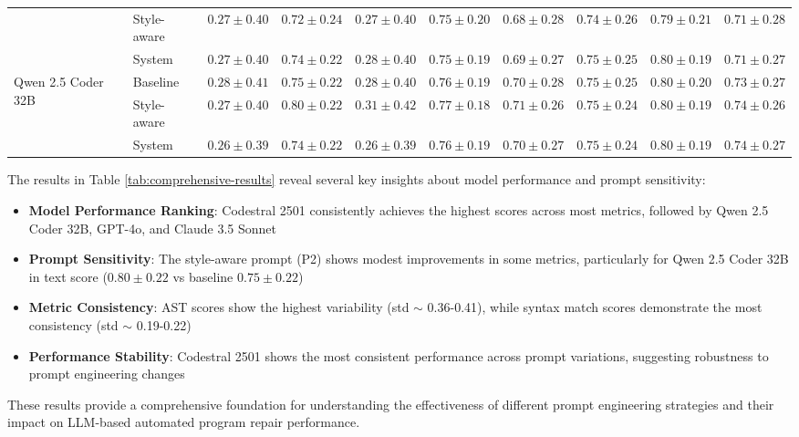\begin{table}[h!]
{\begin{tabular}{|l|l|c|c|c|c|c|c|c|c|}
\cline{2-10}
& Style-aware & $0.27 \pm 0.40$ & $0.72 \pm 0.24$ & $0.27 \pm 0.40$ & $0.75 \pm 0.20$ & $0.68 \pm 0.28$ & $0.74 \pm 0.26$ & $0.79 \pm 0.21$ & $0.71 \pm 0.28$ \\
\cline{2-10}
& System & $0.27 \pm 0.40$ & $0.74 \pm 0.22$ & $0.28 \pm 0.40$ & $0.75 \pm 0.19$ & $0.69 \pm 0.27$ & $0.75 \pm 0.25$ & $0.80 \pm 0.19$ & $0.71 \pm 0.27$ \\
\hline
\multirow{3}{*}{Qwen 2.5 Coder 32B} & Baseline & $0.28 \pm 0.41$ & $0.75 \pm 0.22$ & $0.28 \pm 0.40$ & $0.76 \pm 0.19$ & $0.70 \pm 0.28$ & $0.75 \pm 0.25$ & $0.80 \pm 0.20$ & $0.73 \pm 0.27$ \\
\cline{2-10}
& Style-aware & $0.27 \pm 0.40$ & $0.80 \pm 0.22$ & $0.31 \pm 0.42$ & $0.77 \pm 0.18$ & $0.71 \pm 0.26$ & $0.75 \pm 0.24$ & $0.80 \pm 0.19$ & $0.74 \pm 0.26$ \\
\cline{2-10}
& System & $0.26 \pm 0.39$ & $0.74 \pm 0.22$ & $0.26 \pm 0.39$ & $0.76 \pm 0.19$ & $0.70 \pm 0.27$ & $0.75 \pm 0.24$ & $0.80 \pm 0.19$ & $0.74 \pm 0.27$ \\
\hline
\end{tabular}%
}
\end{table}

The results in Table \ref{tab:comprehensive-results} reveal several key insights about model performance and prompt sensitivity:

\begin{itemize}
    \item \textbf{Model Performance Ranking}: Codestral 2501 consistently achieves the highest scores across most metrics, followed by Qwen 2.5 Coder 32B, GPT-4o, and Claude 3.5 Sonnet
    \item \textbf{Prompt Sensitivity}: The style-aware prompt (P2) shows modest improvements in some metrics, particularly for Qwen 2.5 Coder 32B in text score ($0.80 \pm 0.22$ vs baseline $0.75 \pm 0.22$)
    \item \textbf{Metric Consistency}: AST scores show the highest variability (std $\sim$ 0.36-0.41), while syntax match scores demonstrate the most consistency (std $\sim$ 0.19-0.22)
    \item \textbf{Performance Stability}: Codestral 2501 shows the most consistent performance across prompt variations, suggesting robustness to prompt engineering changes
\end{itemize}

These results provide a comprehensive foundation for understanding the effectiveness of different prompt engineering strategies and their impact on LLM-based automated program repair performance.

